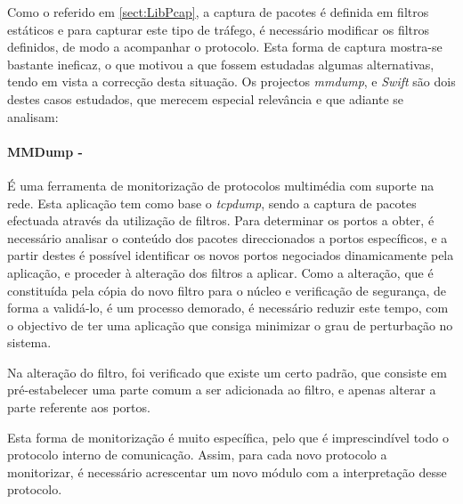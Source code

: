 Como o referido em \ref{sect:LibPcap}, a captura de pacotes é definida em filtros estáticos e para capturar este tipo de tráfego, é necessário modificar os filtros definidos, de modo a acompanhar o protocolo.
Esta forma de captura mostra-se bastante ineficaz, o que motivou a que fossem estudadas algumas alternativas, tendo em vista a correcção desta situação.
Os projectos \textit{mmdump}\cite{505678}, %
e \textit{Swift}\cite{1387609} são dois destes casos estudados, que merecem especial relevância e que adiante se analisam:

\paragraph*{MMDump - } É uma ferramenta de monitorização de protocolos multimédia com suporte na rede.
Esta aplicação tem como base o \textit{tcpdump}, sendo a captura de pacotes efectuada através da utilização de filtros.
Para determinar os portos a obter, é necessário analisar o conteúdo dos pacotes direccionados a portos específicos, e a partir destes é possível identificar os novos portos negociados dinamicamente pela aplicação, e proceder à alteração dos filtros a aplicar.
Como a alteração, que é constituída pela cópia do novo filtro para o núcleo e verificação de segurança, de forma a validá-lo, é um processo demorado, é necessário reduzir este tempo, com o objectivo de ter uma aplicação que consiga minimizar o grau de perturbação no sistema.

Na alteração do filtro, foi verificado que existe um certo padrão, que consiste em pré-estabelecer uma parte comum a ser adicionada ao filtro, e apenas alterar a parte referente aos portos.

Esta forma de monitorização é muito específica, pelo que é imprescindível todo o protocolo interno de comunicação.
Assim, para cada novo protocolo a monitorizar, é necessário acrescentar um novo módulo com a interpretação desse protocolo.


